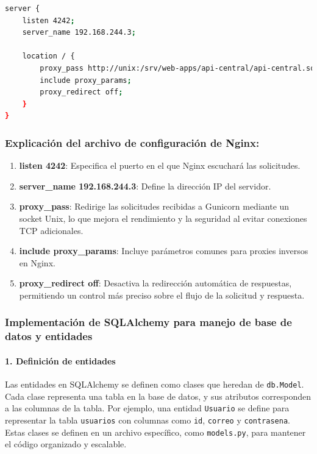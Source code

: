 \begin{lstlisting}[language=bash, caption={Archivo de configuración de Nginx.}]
server {
    listen 4242;
    server_name 192.168.244.3;

    location / {
        proxy_pass http://unix:/srv/web-apps/api-central/api-central.sock;
        include proxy_params;
        proxy_redirect off;
    }
}
\end{lstlisting}

\subsubsection*{Explicación del archivo de configuración de Nginx:}

\begin{enumerate}[label=\roman*.]
    \item \textbf{listen 4242}: Especifica el puerto en el que Nginx escuchará las solicitudes.
    \item \textbf{server\_name 192.168.244.3}: Define la dirección IP del servidor.
    \item \textbf{proxy\_pass}: Redirige las solicitudes recibidas a Gunicorn mediante un socket Unix, lo que mejora el rendimiento y la seguridad al evitar conexiones TCP adicionales.
    \item \textbf{include proxy\_params}: Incluye parámetros comunes para proxies inversos en Nginx.
    \item \textbf{proxy\_redirect off}: Desactiva la redirección automática de respuestas, permitiendo un control más preciso sobre el flujo de la solicitud y respuesta.
\end{enumerate}

\subsubsection{Implementación de SQLAlchemy para manejo de base de datos y entidades}


\paragraph*{1. Definición de entidades}
Las entidades en SQLAlchemy se definen como clases que heredan de \texttt{db.Model}. Cada clase representa una tabla en la base de datos, y sus atributos corresponden a las columnas de la tabla. Por ejemplo, una entidad \texttt{Usuario} se define para representar la tabla \texttt{usuarios} con columnas como \texttt{id}, \texttt{correo} y \texttt{contrasena}. Estas clases se definen en un archivo específico, como \texttt{models.py}, para mantener el código organizado y escalable.

